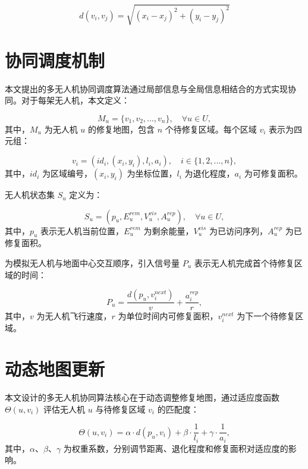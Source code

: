 \documentclass[AutoFakeBold]{LZUThesis}
\begin{document}
\begin{equation}
	d(v_i, v_j) = \sqrt{(x_i - x_j)^2 + (y_i - y_j)^2}
\end{equation}

\section{协同调度机制}

本文提出的多无人机协同调度算法通过局部信息与全局信息相结合的方式实现协同。对于每架无人机，本文定义：

\begin{equation}
	M_u = \{v_1, v_2, ..., v_n\}, \quad \forall u \in U,
\end{equation}
其中，$M_u$ 为无人机 $u$ 的修复地图，包含 $n$ 个待修复区域。每个区域 $v_i$ 表示为四元组：

\begin{equation}
	v_i = (id_i, (x_i, y_i), l_i, a_i), \quad i \in \{1,2,...,n\},
\end{equation}
其中，$id_i$ 为区域编号，$(x_i, y_i)$ 为坐标位置，$l_i$ 为退化程度，$a_i$ 为可修复面积。

无人机状态集 $S_u$ 定义为：

\begin{equation}
	S_u = (p_u, E_u^{rem}, V_u^{vis}, A_u^{rep}), \quad \forall u \in U,
\end{equation}
其中，$p_u$ 表示无人机当前位置，$E_u^{rem}$ 为剩余能量，$V_u^{vis}$ 为已访问序列，$A_u^{rep}$ 为已修复面积。

为模拟无人机与地面中心交互顺序，引入信号量 $P_u$ 表示无人机完成首个待修复区域的时间：

\begin{equation}
	P_u = \frac{d(p_u, v_i^{next})}{v} + \frac{a_i^{rep}}{r},
\end{equation}
其中，$v$ 为无人机飞行速度，$r$ 为单位时间内可修复面积，$v_i^{next}$ 为下一个待修复区域。

\section{动态地图更新}

本文设计的多无人机协同算法核心在于动态调整修复地图，通过适应度函数 $\Theta(u,v_i)$ 评估无人机 $u$ 与待修复区域 $v_i$ 的匹配度：

\begin{equation}
	\Theta(u,v_i) = \alpha \cdot d(p_u, v_i) + \beta \cdot \frac{1}{l_i} + \gamma \cdot \frac{1}{a_i},
\end{equation}
其中，$\alpha$、$\beta$、$\gamma$ 为权重系数，分别调节距离、退化程度和修复面积对适应度的影响。
\end{document}
